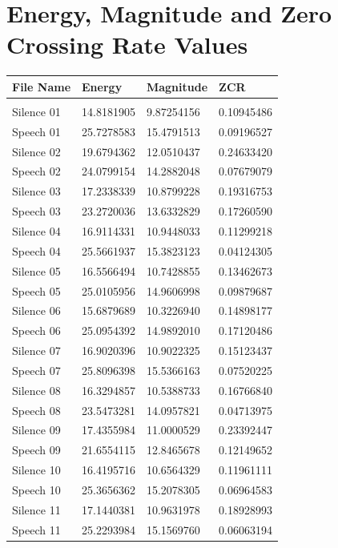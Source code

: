 \documentclass[12pt]{article} %
\begin{document}
\newpage
\appendix
\section{Energy, Magnitude and Zero Crossing Rate Values}
\begin{center}
\begin{longtable}{llll}
File Name & Energy & Magnitude & ZCR \\
\hline \\
 Silence 01  &  14.8181905&  9.87254156&  0.10945486\\ 
 Speech 01  &  25.7278583&  15.4791513&  0.09196527\\ 
 Silence 02  &  19.6794362&  12.0510437&  0.24633420\\ 
 Speech 02  &  24.0799154&  14.2882048&  0.07679079\\ 
 Silence 03  &  17.2338339&  10.8799228&  0.19316753\\ 
 Speech 03  &  23.2720036&  13.6332829&  0.17260590\\ 
 Silence 04  &  16.9114331&  10.9448033&  0.11299218\\ 
 Speech 04  &  25.5661937&  15.3823123&  0.04124305\\ 
 Silence 05  &  16.5566494&  10.7428855&  0.13462673\\ 
 Speech 05  &  25.0105956&  14.9606998&  0.09879687\\ 
 Silence 06  &  15.6879689&  10.3226940&  0.14898177\\ 
 Speech 06  &  25.0954392&  14.9892010&  0.17120486\\ 
 Silence 07  &  16.9020396&  10.9022325&  0.15123437\\ 
 Speech 07  &  25.8096398&  15.5366163&  0.07520225\\ 
 Silence 08  &  16.3294857&  10.5388733&  0.16766840\\ 
 Speech 08  &  23.5473281&  14.0957821&  0.04713975\\ 
 Silence 09  &  17.4355984&  11.0000529&  0.23392447\\ 
 Speech 09  &  21.6554115&  12.8465678&  0.12149652\\ 
 Silence 10  &  16.4195716&  10.6564329&  0.11961111\\ 
 Speech 10  &  25.3656362&  15.2078305&  0.06964583\\ 
 Silence 11  &  17.1440381&  10.9631978&  0.18928993\\ 
 Speech 11  &  25.2293984&  15.1569760&  0.06063194\\ 

\end{longtable}
\end{center}
\end{document}

